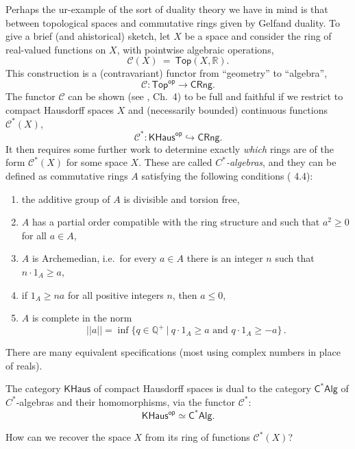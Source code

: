 \documentclass[lambek.tex]{subfiles}
\begin{document}
Perhaps the ur-example of the sort of duality theory we have in mind is that between topological spaces and commutative rings given by Gelfand duality.  To give a brief (and ahistorical) sketch, let $X$ be a  space and consider the ring of real-valued functions on $X$, with pointwise algebraic operations,
\[
 \mathcal{C}(X)\ =\ \mathsf{Top}(X, \mathbb{R}).
 \]
 This construction is a (contravariant) functor from ``geometry'' to ``algebra'',
 \[
 \mathcal{C} : \mathsf{Top}^\mathsf{op} \to \mathsf{CRng}.
 \]
%
The functor $ \mathcal{C}$ can be shown (see \cite{johnstone}, Ch.~4) to be full and faithful if we restrict to compact Hausdorff spaces $X$ and (necessarily bounded) continuous functions  $\mathcal{C}^*(X)$,
 \[
 \mathcal{C}^* : \mathsf{KHaus}^\mathsf{op} \hookrightarrow \mathsf{CRng}.
 \]
It then requires some further work to determine exactly \emph{which} rings are of the form $\mathcal{C}^*(X)$ for some space $X$.   These are called \emph{$C^*$-algebras}, and they can be defined as commutative rings $A$ satisfying the following conditions (\cite{johnstone} 4.4):
\begin{enumerate}
\item the additive group of $A$ is divisible and torsion free,
\item $A$ has a partial order compatible with the ring structure and such that $a^2 \geq 0$ for all $a\in A$,
\item $A$ is Archemedian, i.e.\ for every  $a\in A$ there is an integer $n$ such that $n\cdot 1_A \geq a$,
\item if $1_A\geq na$ for all positive integers $n$, then $a\leq 0$,
\item $A$ is complete in the norm $$||a|| = \inf\{ q\in \mathbb{Q}^+\ |\ q\cdot 1_A \geq a\text{ and } q\cdot 1_A \geq -a\}\,.$$
\end{enumerate}
There are many equivalent specifications (most using complex numbers in place of reals).

 \begin{theorem*}
 The category $\mathsf{KHaus}$ of compact Hausdorff spaces is dual to the category $\mathsf{C^*Alg}$ of $C^*$-algebras and their homomorphisms, via the functor $\mathcal{C}^*$:
 \[
 \mathsf{KHaus}^\mathsf{op} \simeq \mathsf{C^*Alg}.
 \]
 \end{theorem*}

How can we  recover the space $X$ from its ring of functions $\mathcal{C}^*(X)$?
\end{document}
